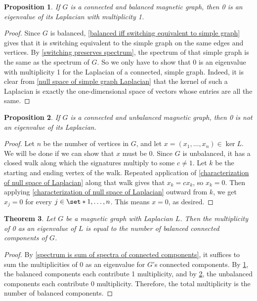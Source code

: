 \documentclass[12pt]{article}
\newtheorem{thm}{Theorem}
\newtheorem{prop}[thm]{Proposition}
\theoremstyle{definition}
\begin{document}
\begin{prop}\label{multiplicity of 0 for connected balanced graph}
If $G$ is a connected and balanced magnetic graph, then 0 is an eigenvalue of its Laplacian with multiplicity 1. 
\end{prop}
\begin{proof}
Since $G$ is balanced, \cref{balanced iff switching equivalent to simple graph} gives that it is switching equivalent to the simple graph on the same edges and vertices. By \cref{switching preserves spectrum}, the spectrum of that simple graph is the same as the spectrum of $G$. So we only have to show that 0 is an eigenvalue with multiplicity 1 for the Laplacian of a connected, simple graph. Indeed, it is clear from \cref{null space of simple graph Laplacian} that the kernel of such a Laplacian is exactly the one-dimensional space of vectors whose entries are all the same.   
\end{proof}

\begin{prop}\label{multiplicity of 0 for connected unbalanced graph}
If $G$ is a connected and unbalanced magnetic graph, then 0 is not an eigenvalue of its Laplacian. 
\end{prop}
\begin{proof}
Let $n$ be the number of vertices in $G$, and let $x = (x_1, \dots, x_n) \in \ker L$. We will be done if we can show that $x$ must be $0$. Since $G$ is unbalanced, it has a closed walk along which the signatures multiply to some $c \neq 1$. Let $k$ be the starting and ending vertex of the walk. Repeated application of \cref{characterization of null space of Laplacian} along that walk gives that $x_k = c x_k$, so $x_k = 0$. Then applying \cref{characterization of null space of Laplacian} outward from $k$, we get $x_j = 0$ for every $j \in \set*{1, \dots, n}$. This means $x = 0$, as desired.
\end{proof}

\begin{thm}\label{nullity of Laplacian}
Let $G$ be a magnetic graph with Laplacian $L$. Then the multiplicity of 0 as an eigenvalue of $L$ is equal to the number of balanced connected components of $G$.
\end{thm}
\begin{proof}
By \cref{spectrum is sum of spectra of connected components}, it suffices to sum the multiplicities of 0 as an eigenvalue for $G$'s connected components. By \cref{multiplicity of 0 for connected balanced graph}, the balanced components each contribute 1 multiplicity, and by \cref{multiplicity of 0 for connected unbalanced graph}, the unbalanced components each contribute 0 multiplicity. Therefore, the total multiplicity is the number of balanced components.
\end{proof}
\end{document}
